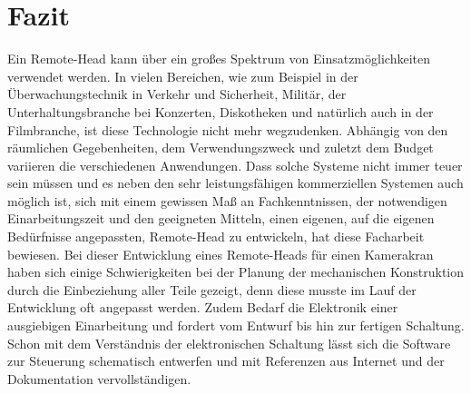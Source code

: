 \documentclass[a4paper, 12pt, bibtotocnumbered, liststotocnumbered]{scrartcl}
\begin{document}
	\section{Fazit}
	Ein Remote-Head kann über ein großes Spektrum von Einsatzmöglichkeiten verwendet werden. In vielen Bereichen, wie zum Beispiel in der Überwachungstechnik in Verkehr und Sicherheit, Militär, der Unterhaltungsbranche bei Konzerten, Diskotheken und natürlich auch in der Filmbranche, ist diese Technologie nicht mehr wegzudenken.  Abhängig von den räumlichen Gegebenheiten, dem Verwendungszweck und zuletzt dem Budget variieren die verschiedenen Anwendungen. Dass solche Systeme nicht immer teuer sein müssen und es neben den sehr leistungsfähigen kommerziellen Systemen auch möglich ist, sich mit einem gewissen Maß an Fachkenntnissen, der notwendigen Einarbeitungszeit und den geeigneten Mitteln, einen eigenen, auf die eigenen Bedürfnisse angepassten, Remote-Head zu entwickeln, hat diese Facharbeit bewiesen. Bei dieser Entwicklung eines Remote-Heads für einen Kamerakran haben sich einige Schwierigkeiten bei der Planung der mechanischen Konstruktion durch die Einbeziehung aller Teile gezeigt, denn diese musste im Lauf der Entwicklung oft angepasst werden. Zudem Bedarf die Elektronik einer ausgiebigen Einarbeitung und fordert vom Entwurf bis hin zur fertigen Schaltung. Schon mit dem Verständnis der elektronischen Schaltung lässt sich die Software zur Steuerung schematisch entwerfen und mit Referenzen aus Internet und der Dokumentation vervollständigen.

	\pagebreak

	\nocite{*}
	
	

	\listoffigures
	\listsubcaptions

	\pagebreak

\end{document}
